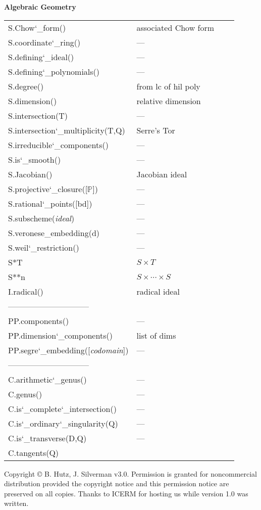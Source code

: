 \documentclass{amsart}
\newcommand{\Section}[1]{\filbreak\par\vspace{5pt}\noindent\textbf{#1}\par\noindent\ignorespaces}
\newcommand{\us}{\char`\_}  %
\def\ver{3.0}
\begin{document}
\begin{multicols}{3}
\Section{Algebraic Geometry}
\noindent
\begin{tabular}{@{\ttfamily\enspace}ll@{\ttfamily\enspace}ll}
S.Chow\us form() & associated Chow form\\
S.coordinate\us ring() & ---\\
S.defining\us ideal() & ---\\
S.defining\us polynomials() & ---\\
S.degree() & from lc of hil poly\\
S.dimension() & relative dimension\\
S.intersection(T) & ---\\
S.intersection\us multiplicity(T,Q) & Serre's Tor\\
S.irreducible\us components() & ---\\
S.is\us smooth() & ---\\
S.Jacobian() & Jacobian ideal\\
S.projective\us closure([$\mathbb{P}$]) & --- \\
S.rational\us points([bd]) & ---\\
S.subscheme(\textit{ideal}) & --- \\
S.veronese\_embedding(d) & ---\\
S.weil\us restriction() & ---\\
S*T & $S \times T$\\
S**n & $S \times \cdots \times S$\\
I.radical() & radical ideal\\
\multicolumn{2}{l}{------------------------------} \\
PP.components() & ---\\
PP.dimension\us components() & list of dims\\
PP.segre\us embedding([\textit{codomain}]) & ---\\
\multicolumn{2}{l}{------------------------------} \\
C.arithmetic\us genus() & ---\\
C.genus() & ---\\
C.is\us complete\us intersection() & ---\\
C.is\us ordinary\us singularity(Q) & ---\\
C.is\us transverse(D,Q) & ---\\
C.tangents(Q) & 
\end{tabular}


\vspace{5pt}
\noindent
\footnotesize{Copyright \copyright {} B. Hutz, J. Silverman
  v\ver. Permission is granted for noncommercial distribution provided
  the copyright notice and this permission notice are preserved on all
  copies. Thanks to ICERM for hosting us while version 1.0 was written.}
\end{multicols}
\newpage
\end{document}
